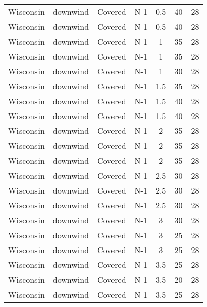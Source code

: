 \documentclass{article}
\begin{document}
\begin{longtable}[c]{ccccccc}
Wisconsin & downwind  & Covered     & N-1             & 0.5          & 40          & 28  \\
Wisconsin & downwind  & Covered     & N-1             & 0.5          & 40          & 28  \\
Wisconsin & downwind  & Covered     & N-1             & 1            & 35          & 28  \\
Wisconsin & downwind  & Covered     & N-1             & 1            & 35          & 28  \\
Wisconsin & downwind  & Covered     & N-1             & 1            & 30          & 28  \\
Wisconsin & downwind  & Covered     & N-1             & 1.5          & 35          & 28  \\
Wisconsin & downwind  & Covered     & N-1             & 1.5          & 40          & 28  \\
Wisconsin & downwind  & Covered     & N-1             & 1.5          & 40          & 28  \\
Wisconsin & downwind  & Covered     & N-1             & 2            & 35          & 28  \\
Wisconsin & downwind  & Covered     & N-1             & 2            & 35          & 28  \\
Wisconsin & downwind  & Covered     & N-1             & 2            & 35          & 28  \\
Wisconsin & downwind  & Covered     & N-1             & 2.5          & 30          & 28  \\
Wisconsin & downwind  & Covered     & N-1             & 2.5          & 30          & 28  \\
Wisconsin & downwind  & Covered     & N-1             & 2.5          & 30          & 28  \\
Wisconsin & downwind  & Covered     & N-1             & 3            & 30          & 28  \\
Wisconsin & downwind  & Covered     & N-1             & 3            & 25          & 28  \\
Wisconsin & downwind  & Covered     & N-1             & 3            & 25          & 28  \\
Wisconsin & downwind  & Covered     & N-1             & 3.5          & 25          & 28  \\
Wisconsin & downwind  & Covered     & N-1             & 3.5          & 20          & 28  \\
Wisconsin & downwind  & Covered     & N-1             & 3.5          & 25          & 28  \\

\end{longtable}
\end{document}

